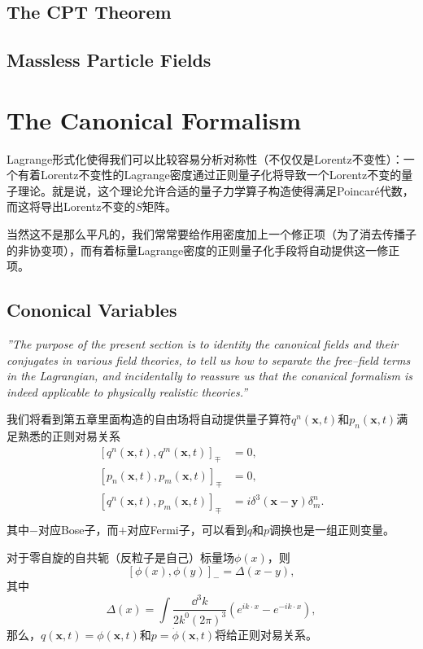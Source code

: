\documentclass[9pt]{extbook}
\theoremstyle{plain}%
\newcommand{\re}[1]
	{\begin{center}
		\colorbox{shadecolor}{
	
		\begin{minipage}{135mm}
				\emph{''#1''}
			\end{minipage}}
	\end{center}}
\begin{document}
\section{The CPT Theorem}

\section{Massless Particle Fields}
\addtocounter{chapter}{1}
\chapter{The Canonical Formalism}
Lagrange形式化使得我们可以比较容易分析对称性（不仅仅是Lorentz不变性）：一个有着Lorentz不变性的Lagrange密度通过正则量子化将导致一个Lorentz不变的量子理论。就是说，这个理论允许合适的量子力学算子构造使得满足Poincar\'{e}代数，而这将导出Lorentz不变的$S$矩阵。

当然这不是那么平凡的，我们常常要给作用密度加上一个修正项（为了消去传播子的非协变项），而有着标量Lagrange密度的正则量子化手段将自动提供这一修正项。

\section{Cononical Variables}
\re{The purpose of the present section is to identity the canonical fields and their conjugates in various field theories, to tell us how to separate the free--field terms in the Lagrangian, and incidentally to reassure us that the conanical formalism is indeed applicable to physically realistic theories.}

我们将看到第五章里面构造的自由场将自动提供量子算符$q^n(\mathbf{x},t)$和$p_n(\mathbf{x},t)$满足熟悉的正则对易关系
\[
	\begin{split}
		[q^n(\mathbf{x},t),q^m(\mathbf{x},t)]_{\mp}&=0,\\
		[p_n(\mathbf{x},t),p_m(\mathbf{x},t)]_{\mp}&=0,\\
		[q^n(\mathbf{x},t),p_m(\mathbf{x},t)]_{\mp}&=i\delta^3(\mathbf{x}-\mathbf{y})\delta^n_m.\\
	\end{split}
\]
其中$-$对应Bose子，而$+$对应Fermi子，可以看到$q$和$p$调换也是一组正则变量。

对于零自旋的自共轭（反粒子是自己）标量场$\phi(x)$，则
\[
	[\phi(x),\phi(y)]_-=\Delta(x-y),
\]
其中
\[
	\Delta(x)=\int\frac{\dd^3 k}{2k^0 (2\pi)^3}(e^{ik\cdot x}-e^{-ik\cdot x}),
\]
那么，$q(\mathbf{x},t)=\phi(\mathbf{x},t)$和$p=\dot{\phi}(\mathbf{x},t)$将给正则对易关系。
\end{document}
